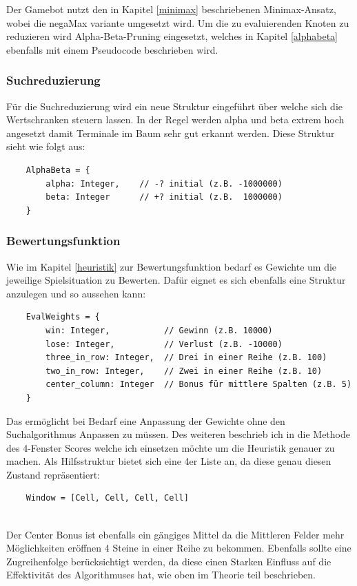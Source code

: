 Der Gamebot nutzt den in Kapitel \ref{minimax} beschriebenen Minimax-Ansatz, wobei die negaMax variante umgesetzt wird. Um die zu evaluierenden Knoten zu reduzieren wird Alpha-Beta-Pruning eingesetzt, welches in Kapitel \ref{alphabeta} ebenfalls mit einem Pseudocode beschrieben wird.  

\subsubsection{Suchreduzierung}
Für die Suchreduzierung wird ein neue Struktur eingeführt über welche sich die Wertschranken steuern lassen. In der Regel werden alpha und beta extrem hoch angesetzt damit Terminale im Baum sehr gut erkannt werden. Diese Struktur sieht wie folgt aus:
\begin{verbatim}
	AlphaBeta = {
		alpha: Integer,    // -? initial (z.B. -1000000)
		beta: Integer      // +? initial (z.B.  1000000)
	}
\end{verbatim}

\newpage

\subsubsection[Heuristik]{Bewertungsfunktion}
Wie im Kapitel \ref{heuristik} zur Bewertungsfunktion bedarf es Gewichte um die jeweilige Spielsituation zu Bewerten. Dafür eignet es sich ebenfalls eine Struktur anzulegen und so aussehen kann:
\begin{verbatim}
	EvalWeights = {
		win: Integer,           // Gewinn (z.B. 10000)
		lose: Integer,          // Verlust (z.B. -10000)
		three_in_row: Integer,  // Drei in einer Reihe (z.B. 100)
		two_in_row: Integer,    // Zwei in einer Reihe (z.B. 10)
		center_column: Integer  // Bonus für mittlere Spalten (z.B. 5)
	}
\end{verbatim}

Das ermöglicht bei Bedarf eine Anpassung der Gewichte ohne den Suchalgorithmus Anpassen zu müssen.
Des weiteren beschrieb ich in die Methode des 4-Fenster Scores welche ich einsetzen möchte um die Heuristik genauer zu machen. Als Hilfsstruktur bietet sich eine 4er Liste an, da diese genau diesen Zustand repräsentiert:
\begin{verbatim}
	Window = [Cell, Cell, Cell, Cell]
\end{verbatim}
\\
Der Center Bonus ist ebenfalls ein gängiges Mittel da die Mittleren Felder mehr Möglichkeiten eröffnen 4 Steine in einer Reihe zu bekommen. Ebenfalls sollte eine Zugreihenfolge berücksichtigt werden, da diese einen Starken Einfluss auf die Effektivität des Algorithmuses hat, wie oben im Theorie teil beschrieben.

